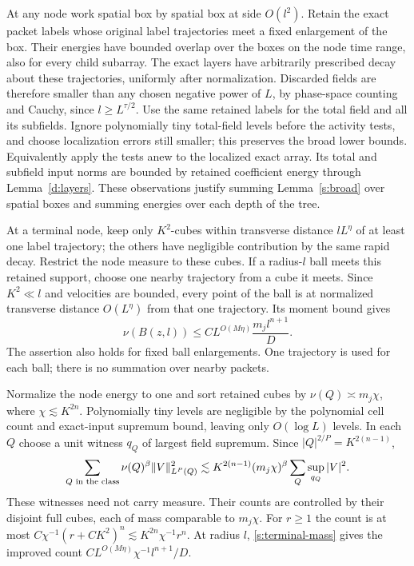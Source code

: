 At any node work spatial box by spatial box at side $O(l^2)$.
Retain the exact packet labels whose original label trajectories meet a
fixed enlargement of the box.  Their energies have bounded overlap
over the boxes on the node time range, also for every child subarray.
The exact layers have arbitrarily prescribed decay about these
trajectories, uniformly after normalization.  Discarded fields are
therefore smaller than any chosen negative power of $L$, by
phase-space counting and Cauchy, since $l\ge L^{\tau/2}$.
Use the same retained labels for the total field and all its subfields.
Ignore polynomially tiny total-field levels before the activity tests,
and choose localization errors still smaller; this preserves the broad
lower bounds.  Equivalently apply the tests anew to the localized
exact array.  Its total and subfield input norms are bounded by retained
coefficient energy through Lemma~\ref{d:layers}.
These observations justify summing Lemma~\ref{s:broad} over spatial
boxes and summing energies over each depth of the tree.

At a terminal node, keep only $K^2$-cubes within transverse distance
$lL^\eta$ of at least one label trajectory; the others have negligible
contribution by the same rapid decay.  Restrict the node measure to
these cubes.  If a radius-$l$ ball meets this retained support, choose
one nearby trajectory from a cube it meets.  Since $K^2\ll l$ and
velocities are bounded, every point of the ball is at normalized
transverse distance $O(L^\eta)$ from that one trajectory.  Its moment
bound gives
\begin{equation}\label{s:terminal-mass}
 \nu(B(z,l))\le C L^{O(M\eta)}\frac{m_jl^{n+1}}D.
\end{equation}
The assertion also holds for fixed ball enlargements.  One trajectory
is used for each ball; there is no summation over nearby packets.

Normalize the node energy to one and sort retained cubes by
$\nu(Q)\asymp m_j\chi$, where $\chi\lesssim K^{2n}$.  Polynomially
tiny levels are negligible by the polynomial cell count and exact-input
supremum bound, leaving only $O(\log L)$ levels.  In each $Q$ choose a
unit witness $q_Q$ of largest field supremum.  Since
$|Q|^{2/P}=K^{2(n-1)}$,
\begin{equation}\label{s:terminal-witness}
 \sum_{Q\text{ in the class}}\nu(Q)^\beta\lVert V\rVert_{L^P(Q)}^2
 \lesssim K^{2(n-1)}(m_j\chi)^\beta
                                  \sum_Q\sup_{q_Q}|V|^2.
\end{equation}
These witnesses need not carry measure.  Their counts are controlled
by their disjoint full cubes, each of mass comparable to $m_j\chi$.
For $r\ge1$ the count is at most
$C\chi^{-1}(r+CK^2)^n\lesssim K^{2n}\chi^{-1}r^n$.
At radius $l$, \eqref{s:terminal-mass} gives the improved count
$C L^{O(M\eta)}\chi^{-1}l^{n+1}/D$.


